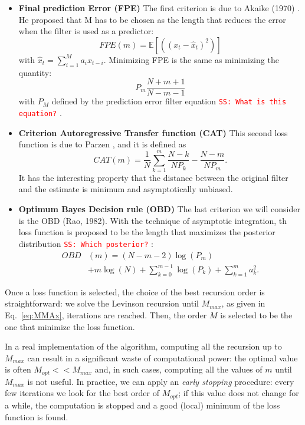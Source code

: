 \documentclass[twocolumn,showpacs,preprintnumbers,nofootinbib,prd,
superscriptaddress,10pt]{revtex4-1}
\newcommand{\sschmidt}[1]{{\textcolor{red}{\texttt{SS: #1}} }}
\begin{document}
\begin{itemize}
\item \textbf{Final prediction Error (FPE)} 
The first criterion is due to Akaike (1970) \cite{Akaike1970StatisticalPI}. He proposed that M has to be chosen as the length that reduces the error when the filter is used as a predictor: 
\begin{equation}
    FPE(m) = \mathbb{E}\left[ \left((x_t - \hat x_t) ^ 2\right) \right]
\end{equation}
with $\hat{x}_t = \sum_{i = 1}^M a_i x_{t - i}$.
Minimizing FPE is the same as minimizing the quantity: 
\begin{equation}
    P_{m} \frac{N + m + 1}{N - m - 1}
\end{equation}
with $P_M$ defined by the prediction error filter equation \sschmidt{What is this equation?}.
\item \textbf{Criterion Autoregressive Transfer function (CAT)}
This second loss function is due to Parzen \cite{bhansali1986}, and it is defined as
\begin{equation}
    CAT(m) = \frac{1}{N}\sum_{k = 1}^m \frac{N - k}{N P_k} - \frac{N - m}{N P_m}.
\end{equation}
It has the interesting property that the distance between the original filter and the estimate is minimum and asymptotically unbiased. 

\item \textbf{Optimum Bayes Decision rule (OBD)} 
The last criterion we will consider is the OBD (Rao, 1982)\cite{doi:10.1029/WR018i004p01097}. With the technique of asymptotic integration, th loss function is proposed to be the length that maximizes the posterior distribution \sschmidt{Which posterior?}: 
   \begin{align}
        OBD&(m) = (N - m - 2) \log(P_m) \nonumber\\
        &+ m \log(N) + \sum_{k = 0}^{m-1} \log(P_k) + \sum_{k = 1}^{m} a_k^2.
    \end{align}
\end{itemize}

Once a loss function is selected, the choice of the best recursion order is straightforward: we solve the Levinson recursion until $M_{max}$, as given in Eq.~\ref{eq:MMAx}, iterations are reached. Then, the order $M$ is selected to be the one that minimize the loss function.

In a real implementation of the algorithm, computing all the recursion up to $M_{max}$ can result in a significant waste of computational power: the optimal value is often $M_{opt}<< M_{max}$ and, in such cases, computing all the values of $m$ until $M_{max}$ is not useful.
In practice, we can apply an \textit{early stopping} procedure: every few iterations we look for the best order of $M_{opt}$; if this value does not change for a while, the computation is stopped and a good (local) minimum of the loss function is found.
\end{document}
